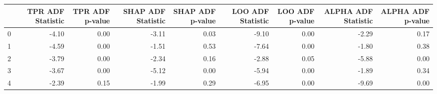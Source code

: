 \begin{tabular}{lrrrrrrrr}
\toprule
 & TPR ADF Statistic & TPR ADF p-value & SHAP ADF Statistic & SHAP ADF p-value & LOO ADF Statistic & LOO ADF p-value & ALPHA ADF Statistic & ALPHA ADF p-value \\
\midrule
0 & -4.10 & 0.00 & -3.11 & 0.03 & -9.10 & 0.00 & -2.29 & 0.17 \\
1 & -4.59 & 0.00 & -1.51 & 0.53 & -7.64 & 0.00 & -1.80 & 0.38 \\
2 & -3.79 & 0.00 & -2.34 & 0.16 & -2.88 & 0.05 & -5.88 & 0.00 \\
3 & -3.67 & 0.00 & -5.12 & 0.00 & -5.94 & 0.00 & -1.89 & 0.34 \\
4 & -2.39 & 0.15 & -1.99 & 0.29 & -6.95 & 0.00 & -9.69 & 0.00 \\
\bottomrule
\end{tabular}
